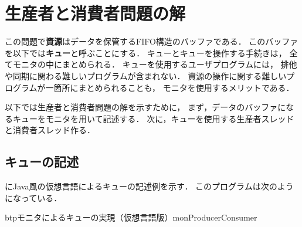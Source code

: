 \section{生産者と消費者問題の解}
この問題で{\bf 資源}はデータを保管するFIFO構造のバッファである．
このバッファを以下では{\bf キュー}と呼ぶことにする．
キューとキューを操作する手続きは，
全てモニタの中にまとめられる．
キューを使用するユーザプログラムには，
排他や同期に関わる難しいプログラムが含まれない．
資源の操作に関する難しいプログラムが一箇所にまとめられることも，
モニタを使用するメリットである．

以下では生産者と消費者問題の解を示すために，
まず，データのバッファになるキューをモニタを用いて記述する．
次に，キューを使用する生産者スレッドと消費者スレッド作る．

\subsection{キューの記述}
にJava風の仮想言語によるキューの記述例を示す．
このプログラムは次のようになっている．

\begin{myfig}{btp}{モニタによるキューの実現（仮想言語版）}{monProducerConsumer}

\end{myfig}

